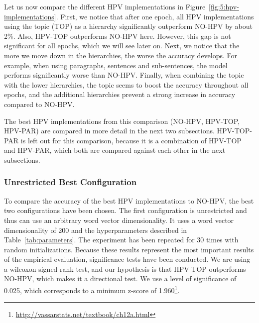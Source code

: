 Let us now compare the different HPV implementations in Figure~\ref{fig:5:hpv-implementations}. First, we notice that after one epoch, all HPV implementations using the topic (TOP) as a hierarchy significantly outperform NO-HPV by about 2\%. Also, HPV-TOP outperforms NO-HPV here. However, this gap is not significant for all epochs, which we will see later on. Next, we notice that the more we move down in the hierarchies, the worse the accuracy develops. For example, when using paragraphs, sentences and sub-sentences, the model performs significantly worse than NO-HPV\@. Finally, when combining the topic with the lower hierarchies, the topic seems to boost the accuracy throughout all epochs, and the additional hierarchies prevent a strong increase in accuracy compared to NO-HPV\@.

The best HPV implementations from this comparison (NO-HPV, HPV-TOP, HPV-PAR) are compared in more detail in the next two subsections. HPV-TOP-PAR is left out for this comparison, because it is a combination of HPV-TOP and HPV-PAR, which both are compared against each other in the next subsections.

\subsubsection{Unrestricted Best Configuration}\label{unrestricted-best-configuration}

To compare the accuracy of the best HPV implementations to NO-HPV, the best two configurations have been chosen. The first configuration is unrestricted and thus can use an arbitrary word vector dimensionality. It uses a word vector dimensionality of 200 and the hyperparameters described in Table~\ref{tab:parameters}. The experiment has been repeated for 30 times with random initializations. Because these results represent the most important results of the empirical evaluation, significance tests have been conducted. We are using a wilcoxon signed rank test, and our hypothesis is that HPV-TOP outperforms NO-HPV, which makes it a directional test. We use a level of significance of 0.025, which corresponds to a minimum z-score of 1.960\footnote{\url{http://vassarstats.net/textbook/ch12a.html}}.

